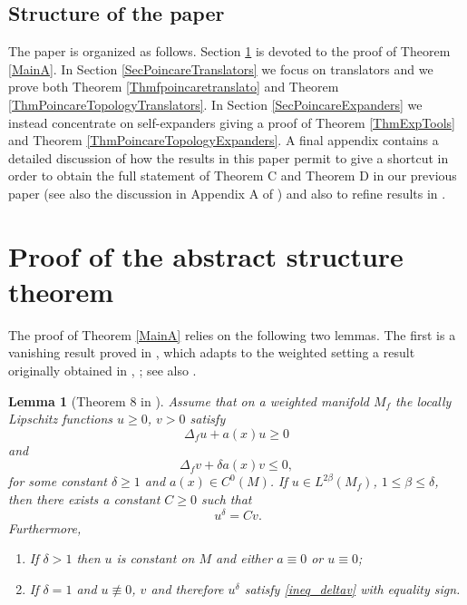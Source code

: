 \documentclass[11pt, leqno]{amsart}
\newtheorem{lemma}[theorem]{Lemma}
\begin{document}
\subsection{Structure of the paper} The paper is organized as follows. Section \ref{Sect_AbstrStrThm} is devoted to the proof of Theorem \ref{MainA}. In Section \ref{SecPoincareTranslators} we focus on translators and we prove both Theorem \ref{Thmfpoincaretranslato} and Theorem \ref{ThmPoincareTopologyTranslators}. In Section \ref{SecPoincareExpanders} we instead concentrate on self-expanders giving a proof of Theorem \ref{ThmExpTools} and Theorem \ref{ThmPoincareTopologyExpanders}. A final appendix contains a detailed discussion of how the results in this paper permit to give a shortcut in order to obtain the full statement of Theorem C and Theorem D in our previous paper \cite{ImperaRimoldi_Transl} (see also the discussion in Appendix A of \cite{IR_MathZ}) and also to refine results in \cite{IR_MathZ}.
\section{Proof of the abstract structure theorem}\label{Sect_AbstrStrThm}

The proof of Theorem \ref{MainA} relies on the following two lemmas. The first is a vanishing result proved in \cite{R1}, which adapts to the weighted setting a result originally obtained in \cite{PRS-JFA05}, \cite{PRS-Book}; see also \cite{PV1}.

\begin{lemma}[Theorem 8 in \cite{R1}]\label{Liouville}
Assume that on a weighted manifold $M_f$ the locally Lipschitz functions $u\geq 0$, $v>0$ satisfy
\begin{equation}\label{ineq_u}
\Delta_fu+a(x)u\geq0
\end{equation}
and
\begin{equation}\label{ineq_deltav}
\Delta_fv+\delta a(x)v\leq0,
\end{equation}
for some constant $\delta\geq1$ and $a(x)\in C^0(M)$. If $u\in L^{2\beta}\left(M_f\right)$, $1\leq\beta\leq \delta$, then there exists a constant $C\geq0$ such that 
\[
\ u^{\delta}=Cv.
\]
Furthermore,
\begin{enumerate}
	\item [(i)]If $\delta>1$ then $u$ is constant on $M$ and either $a\equiv 0$ or $u\equiv 0$;
	\item [(ii)]If $\delta=1$ and $u\not\equiv0$, $v$ and therefore $u^\delta$ satisfy \eqref{ineq_deltav} with equality sign.
\end{enumerate}
\end{lemma}
\end{document}
